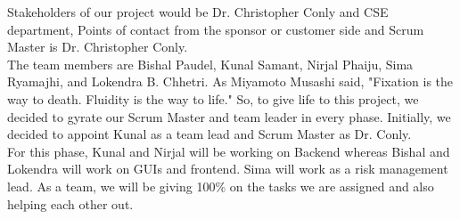 Stakeholders of our project would be Dr. Christopher Conly and CSE department, Points of contact from the sponsor or customer side and Scrum Master is Dr. Christopher Conly.
\\
The team members are Bishal Paudel, Kunal Samant, Nirjal Phaiju, Sima Ryamajhi, and Lokendra B. Chhetri. As Miyamoto Musashi said, "Fixation is the way to death. Fluidity is the way to life." So, to give life to this project, we decided to gyrate our Scrum Master and team leader in every phase. Initially, we decided to appoint Kunal as a team lead and Scrum Master as Dr. Conly.
\\
For this phase, Kunal and Nirjal will be working on Backend whereas Bishal and Lokendra will work on GUIs and frontend. Sima will work as a risk management lead. As a team, we will be giving 100{\%} on the tasks we are assigned and also helping each other out.

